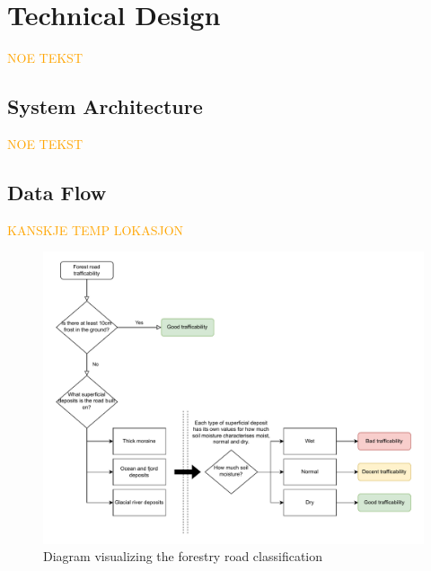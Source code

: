 \chapter{Technical Design}

\textcolor{orange}{NOE TEKST}

\section{System Architecture}\label{sec:systemarchitecture}

\textcolor{orange}{NOE TEKST}

\section{Data Flow} %

\textcolor{orange}{KANSKJE TEMP LOKASJON}

\begin{figure}[h]
    \centering
    \includegraphics[width=1\linewidth]{figures/roadclassification.pdf}
    \caption{Diagram visualizing the forestry road classification}
    \label{fig:forestry_road_classification}
\end{figure}

